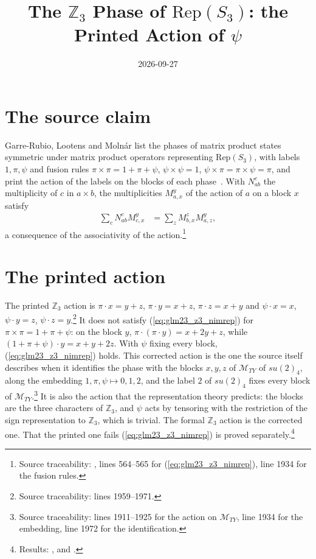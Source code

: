 \documentclass{article}
\title{The $\mathbb Z_3$ Phase of $\mathrm{Rep}(S_3)$: the Printed Action of $\psi$}
\author{}
\date{2026-09-27}
\begin{document}
\maketitle
{}

\section{The source claim}
Garre-Rubio, Lootens and Moln\'ar list the phases of matrix product states
symmetric under matrix product operators representing $\mathrm{Rep}(S_3)$,
with labels $1,\pi,\psi$ and fusion rules $\pi\times\pi=1+\pi+\psi$,
$\psi\times\psi=1$, $\psi\times\pi=\pi\times\psi=\pi$, and print the action of
the labels on the blocks of each phase~\cite{GarreRubio2023MPOSym}. With
$N_{ab}^c$ the multiplicity of $c$ in $a\times b$, the multiplicities $M_{a,x}^y$ of the action of $a$ on a block $x$ satisfy
\begin{align}
    \sum_c N_{ab}^c M_{c,x}^y & =\sum_z M_{b,x}^z M_{a,z}^y ,
    \label{eq:glm23_z3_nimrep}
\end{align}
a consequence of the associativity of the action.\footnote{Source
    traceability: , lines 564--565
    for (\ref{eq:glm23_z3_nimrep}), line 1934 for the fusion rules.}

\section{The printed action}
The printed $\mathbb Z_3$ action is
$\pi\cdot x=y+z$, $\pi\cdot y=x+z$, $\pi\cdot z=x+y$ and
$\psi\cdot x=x$, $\psi\cdot y=z$, $\psi\cdot z=y$.\footnote{Source
    traceability: lines 1959--1971.} It does not satisfy
(\ref{eq:glm23_z3_nimrep}) for $\pi\times\pi=1+\pi+\psi$: on the block $y$,
$\pi\cdot(\pi\cdot y)=x+2y+z$, while $(1+\pi+\psi)\cdot y=x+y+2z$. With $\psi$
fixing every block, (\ref{eq:glm23_z3_nimrep}) holds. This corrected action
is the one the source itself describes when it identifies the phase with the
blocks $x,y,z$ of $\mathcal M_{TY}$ of $su(2)_4$, along the embedding $1,\pi,\psi\mapsto0,1,2$, and the label $2$ of $su(2)_4$ fixes every block of $\mathcal M_{TY}$.\footnote{Source traceability: lines 1911--1925 for the action on $\mathcal M_{TY}$, line 1934 for the embedding, line 1972 for the identification.} It is
also the action that the representation theory predicts: the blocks are the
three characters of $\mathbb Z_3$, and $\psi$ acts by tensoring with the
restriction of the sign representation to $\mathbb Z_3$, which is trivial.
The formal $\mathbb Z_3$ action is the corrected one. That the printed one
fails (\ref{eq:glm23_z3_nimrep}) is proved
separately.\footnote{Results: ,
     and
    .}
\end{document}

